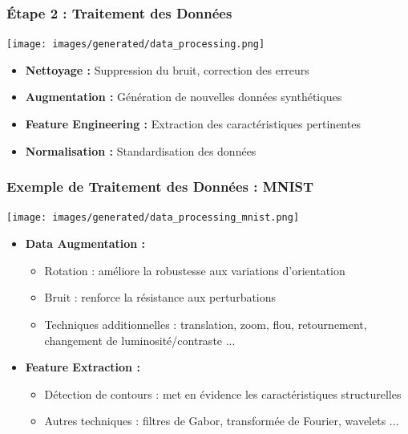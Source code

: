 \documentclass{beamer}
\begin{document}
\begin{frame}
    \frametitle{Étape 2 : Traitement des Données}
    \begin{center}
        \texttt{[image: images/generated/data\_processing.png]}
    \end{center}
    \begin{itemize}
        \item \textbf{Nettoyage :} Suppression du bruit, correction des erreurs
        \item \textbf{Augmentation :} Génération de nouvelles données synthétiques
        \item \textbf{Feature Engineering :} Extraction des caractéristiques pertinentes
        \item \textbf{Normalisation :} Standardisation des données
    \end{itemize}
\end{frame}

\begin{frame}
    \frametitle{Exemple de Traitement des Données : MNIST}
    \begin{center}
        \texttt{[image: images/generated/data\_processing\_mnist.png]}
    \end{center}
    \begin{itemize}
        \item \textbf{Data Augmentation :}
        \begin{itemize}
            \item Rotation : améliore la robustesse aux variations d'orientation
            \item Bruit : renforce la résistance aux perturbations
            \item Techniques additionnelles : translation, zoom, flou, retournement, changement de luminosité/contraste ...
        \end{itemize}
        \item \textbf{Feature Extraction :}
        \begin{itemize}
            \item Détection de contours : met en évidence les caractéristiques structurelles
            \item Autres techniques : filtres de Gabor, transformée de Fourier, wavelets ...
        \end{itemize}
    \end{itemize}
\end{frame}
\end{document}
